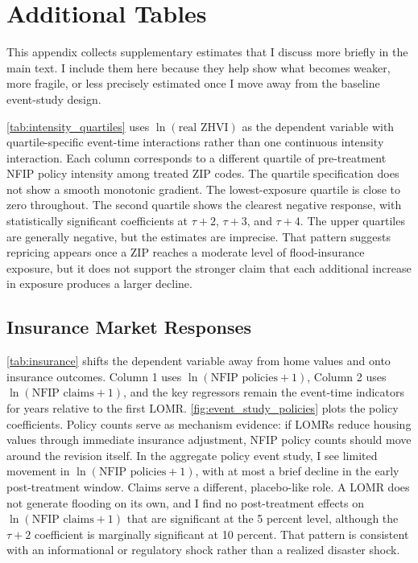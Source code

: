 \documentclass[12pt]{article}
\begin{document}
\section{Additional Tables}\label{app:tables}

This appendix collects supplementary estimates that I discuss more briefly in the main text. I include them here because they help show what becomes weaker, more fragile, or less precisely estimated once I move away from the baseline event-study design.

\autoref{tab:intensity_quartiles} uses $\ln(\text{real ZHVI})$ as the dependent variable with quartile-specific event-time interactions rather than one continuous intensity interaction. Each column corresponds to a different quartile of pre-treatment NFIP policy intensity among treated ZIP codes. The quartile specification does not show a smooth monotonic gradient. The lowest-exposure quartile is close to zero throughout. The second quartile shows the clearest negative response, with statistically significant coefficients at $\tau{+}2$, $\tau{+}3$, and $\tau{+}4$. The upper quartiles are generally negative, but the estimates are imprecise. That pattern suggests repricing appears once a ZIP reaches a moderate level of flood-insurance exposure, but it does not support the stronger claim that each additional increase in exposure produces a larger decline.



\subsection*{Insurance Market Responses}\label{app:insurance}

\autoref{tab:insurance} shifts the dependent variable away from home values and onto insurance outcomes. Column 1 uses $\ln(\text{NFIP policies} + 1)$, Column 2 uses $\ln(\text{NFIP claims} + 1)$, and the key regressors remain the event-time indicators for years relative to the first LOMR. \autoref{fig:event_study_policies} plots the policy coefficients. Policy counts serve as mechanism evidence: if LOMRs reduce housing values through immediate insurance adjustment, NFIP policy counts should move around the revision itself. In the aggregate policy event study, I see limited movement in $\ln(\text{NFIP policies} + 1)$, with at most a brief decline in the early post-treatment window. Claims serve a different, placebo-like role. A LOMR does not generate flooding on its own, and I find no post-treatment effects on $\ln(\text{NFIP claims} + 1)$ that are significant at the 5 percent level, although the $\tau{+}2$ coefficient is marginally significant at 10 percent. That pattern is consistent with an informational or regulatory shock rather than a realized disaster shock.
\end{document}

